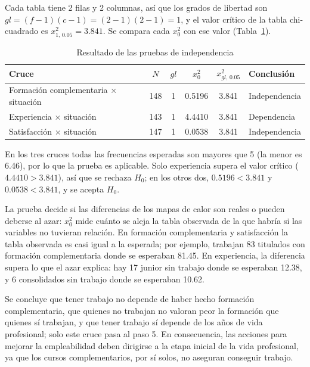 \documentclass[12pt, a4paper]{article}
\newenvironment{mitabla}[2][H]{%
  \begin{table}[#1]
  \centering
  \caption{#2}
  \small
}{%
  \end{table}
}
\begin{document}
Cada tabla tiene 2 filas y 2 columnas, así que los grados de libertad
son $gl = (f-1)(c-1) = (2-1)(2-1) = 1$, y el valor crítico de la tabla
chi-cuadrado es $x^2_{1,\,0.05} = 3.841$. Se compara cada $x_0^2$ con ese
valor (Tabla~\ref{tab:real-independencia}).

\begin{mitabla}{Resultado de las pruebas de independencia}\label{tab:real-independencia}
\begin{tabular}{lccccl}
\toprule
\textbf{Cruce} & \textbf{$N$} & \textbf{$gl$} & \textbf{$x_0^2$} & \textbf{$x^2_{gl,\,0.05}$} & \textbf{Conclusión} \\
\midrule
Formación complementaria $\times$ situación & 148 & 1 & 0.5196 & 3.841 & Independencia \\
Experiencia $\times$ situación              & 143 & 1 & 4.4410 & 3.841 & Dependencia \\
Satisfacción $\times$ situación             & 147 & 1 & 0.0538 & 3.841 & Independencia \\
\bottomrule
\end{tabular}
\end{mitabla}

En los tres cruces todas las frecuencias esperadas son mayores que 5 (la
menor es 6.46), por lo que la prueba es aplicable. Solo experiencia supera
el valor crítico ($4.4410 > 3.841$), así que se rechaza $H_0$; en los otros
dos, $0.5196 < 3.841$ y $0.0538 < 3.841$, y se acepta $H_0$.

La prueba decide si las diferencias de los mapas de calor son reales o
pueden deberse al azar: $x_0^2$ mide cuánto se aleja la tabla observada
de la que habría si las variables no tuvieran relación. En formación
complementaria y satisfacción la tabla observada es casi igual a la
esperada; por ejemplo, trabajan 83 titulados con formación complementaria
donde se esperaban 81.45. En experiencia, la diferencia supera lo que el
azar explica: hay 17 junior sin trabajo donde se esperaban 12.38, y 6
consolidados sin trabajo donde se esperaban 10.62.

Se concluye que tener trabajo no depende de haber hecho formación
complementaria, que quienes no trabajan no valoran peor la formación que
quienes sí trabajan, y que tener trabajo sí depende de los años de vida
profesional; solo este cruce pasa al paso 5. En consecuencia, las
acciones para mejorar la empleabilidad deben dirigirse a la etapa inicial
de la vida profesional, ya que los cursos complementarios, por sí solos,
no aseguran conseguir trabajo.
\end{document}
